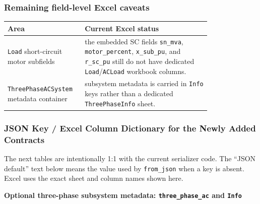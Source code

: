 \subsubsection*{Remaining field-level Excel caveats}

\begin{longtable}{L{0.24\linewidth}L{0.56\linewidth}}
\toprule
Area & Current Excel status \\
\midrule
\endhead
\texttt{Load} short-circuit motor subfields & the embedded SC fields \texttt{sn\_mva}, \texttt{motor\_percent}, \texttt{x\_sub\_pu}, and \texttt{r\_sc\_pu} still do not have dedicated \texttt{Load}/\texttt{ACLoad} workbook columns. \\
\texttt{ThreePhaseACSystem} metadata container & subsystem metadata is carried in \texttt{Info} keys rather than a dedicated \texttt{ThreePhaseInfo} sheet. \\
\bottomrule
\end{longtable}

\subsubsection*{JSON Key / Excel Column Dictionary for the Newly Added Contracts}

The next tables are intentionally 1:1 with the current serializer code.  The
``JSON default'' text below means the value used by \texttt{from\_json} when a
key is absent.  Excel uses the exact sheet and column names shown here.

\footnotesize

\noindent\textbf{Optional three-phase subsystem metadata: \texttt{three\_phase\_ac} and \texttt{Info}}

